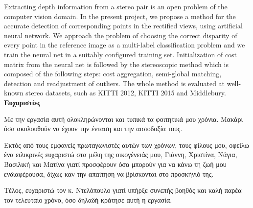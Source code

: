 \documentclass[
11pt, %
english, %
greek, %
singlespacing, %
headsepline, %
consistentlayout, %
usenames,
dvipsnames
]{MastersDoctoralThesis} %
\def\g{\selectlanguage{greek}}
\begin{document}
	Extracting depth information from a stereo pair is an open problem of the computer vision domain. In the present project, we propose a method for the accurate detection of corresponding points in the rectified views, using artificial neural network. We approach the problem of choosing the correct disparity of every point in the reference image as a multi-label classification problem and we train the neural net in a suitably configured training set. Initialization of cost matrix from the neural net is followed by the stereoscopic method which is composed of the following steps: cost aggregation, semi-global matching, detection and readjustment of outliers. The whole method is evaluated at well-known stereo datasets, such as KITTI 2012, KITTI 2015 and Middlebury.
\clearpage
\g
{\huge \textbf{Ευχαριστίες}}
\break

Με την εργασία αυτή ολοκληρώνονται και τυπικά τα φοιτητικά μου χρόνια. Μακάρι όσα ακολουθούν να έχουν την ένταση και την αισιοδοξία τους. 

Εκτός από τους εμφανείς πρωταγωνιστές αυτών των χρόνων, τους φίλους μου, οφείλω ένα ειλικρινές ευχαριστώ στα μέλη της οικογένειάς μου, Γιάννη, Χριστίνα, Νάγια, Βασιλική και Ματίνα γιατί προσφέρουν όσα μπορούν για να κάνω τη ζωή μου ενδιαφέρουσα, δίχως καν την απαίτηση να βρίσκονται στο προσκήνιό της.

Τέλος, ευχαριστώ τον κ. Ντελόπουλο γιατί υπήρξε συνεπής βοηθός και καλή παρέα τον τελευταίο χρόνο, όσο δηλαδή κράτησε αυτή η εργασία.
\clearpage

\g
\renewcommand*\contentsname{\g Περιεχόμενα}
\tableofcontents %

\begin{comment}
\g
\addcontentsline{toc}{chapter}{Κατάλογος σχημάτων}
\renewcommand*\listfigurename{\g Κατάλογος σχημάτων}
\listoffigures %

\g
\addcontentsline{toc}{chapter}{\g Κατάλογος πινάκων}
\renewcommand*\listtablename{\g Κατάλογος πινάκων}
\listoftables %
\end{comment}
\end{document}
